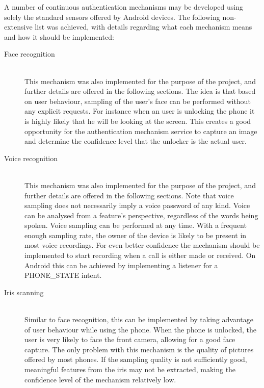 A number of continuous authentication mechanisms may be developed using solely the standard sensors offered by Android devices. The following non-extensive list was achieved, with details regarding what each mechanism means and how it should be implemented:
\begin{description}
  \item[Face recognition] \hfill \\
  This mechanism was also implemented for the purpose of the project, and further details are offered in the following sections. The idea is that based on user behaviour, sampling of the user's face can be performed without any explicit requests. For instance when an user is unlocking the phone it is highly likely that he will be looking at the screen. This creates a good opportunity for the authentication mechanism service to capture an image and determine the confidence level that the unlocker is the actual user.
  
  \item[Voice recognition] \hfill \\
  This mechanism was also implemented for the purpose of the project, and further details are offered in the following sections. Note that voice sampling does not necessarily imply a voice password of any kind. Voice can be analysed from a feature's perspective, regardless of the words being spoken. Voice sampling can be performed at any time. With a frequent enough sampling rate, the owner of the device is likely to be present in most voice recordings. For even better confidence the mechanism should be implemented to start recording when a call is either made or received. On Android this can be achieved by implementing a listener for a PHONE\_STATE intent.
  
  \item[Iris scanning] \hfill \\
  Similar to face recognition, this can be implemented by taking advantage of user behaviour while using the phone. When the phone is unlocked, the user is very likely to face the front camera, allowing for a good face capture. The only problem with this mechanism is the quality of pictures offered by most phones. If the sampling quality is not sufficiently good, meaningful features from the iris may not be extracted, making the confidence level of the mechanism relatively low.
  

\end{description}
